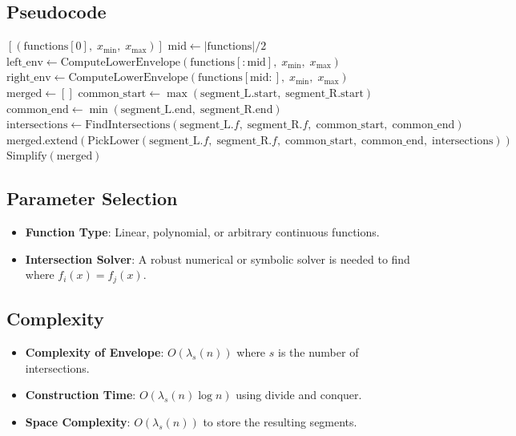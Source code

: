 \subsection{Pseudocode}
\begin{algorithm}[ht]
\label{alg:compute_lower_envelope}
\begin{algorithmic}[1]
        \State \Return $[(\text{functions}[0],\; x_{\min},\; x_{\max})]$
    \EndIf
    \State $\text{mid} \gets |\text{functions}| / 2$
    \State $\text{left\_env} \gets \text{ComputeLowerEnvelope}(\text{functions}[:\text{mid}],\; x_{\min},\; x_{\max})$
    \State $\text{right\_env} \gets \text{ComputeLowerEnvelope}(\text{functions}[\text{mid}:],\; x_{\min},\; x_{\max})$
    \State $\text{merged} \gets []$
            \State $\text{common\_start} \gets \max(\text{segment\_L}.\text{start},\; \text{segment\_R}.\text{start})$
            \State $\text{common\_end} \gets \min(\text{segment\_L}.\text{end},\; \text{segment\_R}.\text{end})$
                \State $\text{intersections} \gets \text{FindIntersections}(\text{segment\_L}.f,\; \text{segment\_R}.f,\; \text{common\_start},\; \text{common\_end})$
                \State $\text{merged}.\text{extend}(\text{PickLower}(\text{segment\_L}.f,\; \text{segment\_R}.f,\; \text{common\_start},\; \text{common\_end},\; \text{intersections}))$
            \EndIf
        \EndFor
    \EndFor
    \State \Return $\text{Simplify}(\text{merged})$
\EndFunction
\end{algorithmic}
\end{algorithm}

\subsection{Parameter Selection}
\begin{itemize}
    \item \textbf{Function Type}: Linear, polynomial, or arbitrary continuous functions.
    \item \textbf{Intersection Solver}: A robust numerical or symbolic solver is needed to find where $f_i(x) = f_j(x)$.
\end{itemize}

\subsection{Complexity}
\begin{itemize}
    \item \textbf{Complexity of Envelope}: $O(\lambda_s(n))$ where $s$ is the number of intersections.
    \item \textbf{Construction Time}: $O(\lambda_s(n) \log n)$ using divide and conquer.
    \item \textbf{Space Complexity}: $O(\lambda_s(n))$ to store the resulting segments.
\end{itemize}


